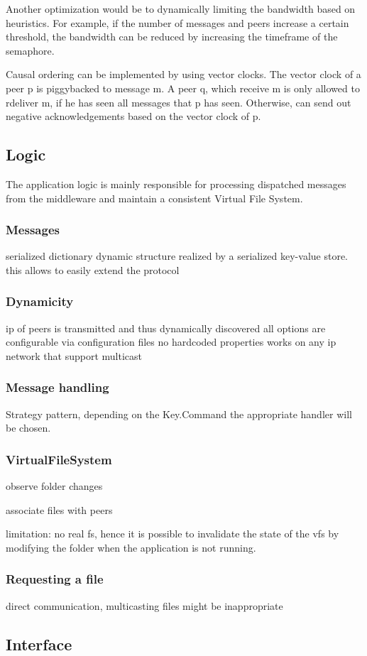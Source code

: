 Another optimization would be to dynamically limiting the bandwidth based on heuristics. For example, if the number of messages and peers increase a certain threshold, the bandwidth can be reduced by increasing the timeframe of the semaphore. 

Causal ordering can be implemented by using vector clocks. The vector clock of a peer p is piggybacked to message m. A peer q, which receive m is only allowed to rdeliver m, if he has seen all messages that p has seen. Otherwise, can send out negative acknowledgements based on the vector clock of p. 
\subsection{Logic}

The application logic is mainly responsible for processing dispatched messages from the middleware and maintain a consistent Virtual File System.
    
    \subsubsection{Messages}
    serialized dictionary
    dynamic structure realized by a serialized key-value store. 
    this allows to easily extend the protocol

    \subsubsection{Dynamicity}
    ip of peers is transmitted and thus dynamically discovered
    all options are configurable via configuration files
    no hardcoded properties
    works on any ip network that support multicast
    
    
    \subsubsection{Message handling}
    Strategy pattern, depending on the Key.Command the appropriate handler will be chosen.
    
    \subsubsection{VirtualFileSystem}
    
    observe folder changes
    
    associate files with peers
    
    limitation: no real fs, hence it is possible to invalidate the state of the vfs by modifying the folder when the application is not running. 
    
    \subsubsection{Requesting a file}
    
    direct communication, multicasting files might be inappropriate
    

    
    
    

\subsection{Interface}